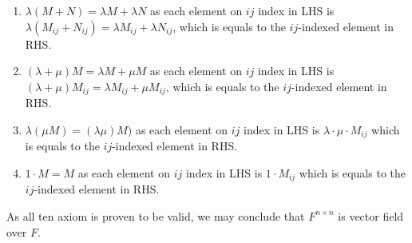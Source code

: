 \documentclass[11pt]{article}
\begin{document}
\begin{enumerate}
    \item $\lambda (M + N) = \lambda M + \lambda N$ as each element on $ij$ index in LHS is $\lambda(M_{ij} + N_{ij}) = \lambda M_{ij} + \lambda N_{ij}$, which is equals to the $ij$-indexed element in RHS.
    \item $(\lambda + \mu) M = \lambda M + \mu M$ as each element on $ij$ index in LHS is $(\lambda + \mu) M_{ij} =\lambda M_{ij} + \mu M_{ij}$, which is equals to the $ij$-indexed element in RHS.
    \item $\lambda (\mu M) = (\lambda \mu) M)$ as each element on $ij$ index in LHS is $\lambda \cdot \mu \cdot  M_{ij}$ which is equals to the $ij$-indexed element in RHS.
    \item $1 \cdot M = M$  as each element on $ij$ index in LHS is $1 \cdot M_{ij}$ which is equals to the $ij$-indexed element in RHS.
\end{enumerate}\newline

As all ten axiom is proven to be valid, we may conclude that $F^{n \times n}$ is vector field over $F$.
\end{document}
